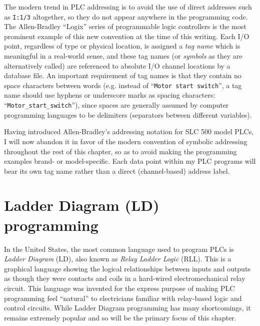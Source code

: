 The modern trend in PLC addressing is to avoid the use of direct addresses such as \texttt{I:1/3} altogether, so they do not appear anywhere in the programming code.  The Allen-Bradley ``Logix'' series of programmable logic controllers is the most prominent example of this new convention at the time of this writing.  Each I/O point, regardless of type or physical location, is assigned a \textit{tag name} which is meaningful in a real-world sense, and these tag names (or \textit{symbols} as they are alternatively called) are referenced to absolute I/O channel locations by a database file.  An important requirement of tag names is that they contain no space characters between words (e.g. instead of ``\texttt{Motor start switch}'', a tag name should use hyphens or underscore marks as spacing characters: ``\texttt{Motor\_start\_switch}''), since spaces are generally assumed by computer programming languages to be delimiters (separators between different variables).      

\vskip 10pt

Having introduced Allen-Bradley's addressing notation for SLC 500 model PLCs, I will now abandon it in favor of the modern convention of symbolic addressing throughout the rest of this chapter, so as to avoid making the programming examples brand- or model-specific.  Each data point within my PLC programs will bear its own tag name rather than a direct (channel-based) address label.








\filbreak
\section{Ladder Diagram (LD) programming}

In the United States, the most common language used to program PLCs is \textit{Ladder Diagram} (LD), also known as \textit{Relay Ladder Logic} (RLL).  This is a graphical language showing the logical relationships between inputs and outputs as though they were contacts and coils in a hard-wired electromechanical relay circuit.  This language was invented for the express purpose of making PLC programming feel ``natural'' to electricians familiar with relay-based logic and control circuits.  While Ladder Diagram programming has many shortcomings, it remains extremely popular and so will be the primary focus of this chapter.        


